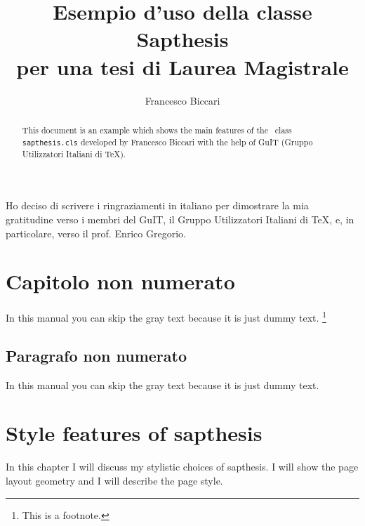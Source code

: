 \documentclass[LaM,binding=0.6cm]{sapthesis}
\title{Esempio d'uso della classe Sapthesis\\ per una tesi di Laurea Magistrale}
\author{Francesco Biccari}
\begin{document}
\frontmatter

\maketitle

\dedication{Dedicato a\\ Donald Knuth}

\begin{abstract}
This document is an example which shows the main features of
the \LaTeXe\ class \texttt{sapthesis.cls} developed by Francesco Biccari
with the help of GuIT (Gruppo Utilizzatori Italiani di \TeX).
\end{abstract}

\begin{acknowledgments}
Ho deciso di scrivere i ringraziamenti in italiano
per dimostrare la mia gratitudine verso i membri
del GuIT, il Gruppo Utilizzatori Italiani di \TeX, e, in particolare,
verso il prof. Enrico Gregorio.
\end{acknowledgments}

\tableofcontents

\chapter{Capitolo non numerato}

In this manual you can skip the gray text because it is just dummy text.%
\footnote{This is a footnote.}

\textcolor{gray}{\lipsum[1-22]}


\section*{Paragrafo non numerato}

In this manual you can skip the gray text because it is just dummy text.

\textcolor{gray}{\lipsum[1-22]}




\mainmatter

\chapter{Style features of \textsf{sapthesis}}

In this chapter I will discuss my stylistic choices of \textsf{sapthesis}.
I will show the page layout geometry and I will describe the page style.
\end{document}
